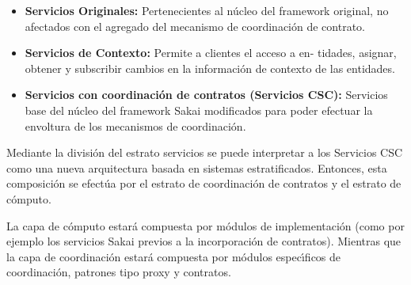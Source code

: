 \begin{itemize}

\item \textbf{Servicios Originales:} Pertenecientes al núcleo del framework original, no afectados con el agregado del mecanismo
de coordinación de contrato.

\item \textbf{Servicios de Contexto:} Permite a clientes el acceso a en-
tidades, asignar, obtener y subscribir cambios en la información de contexto de las entidades.

\item \textbf{Servicios con coordinación de contratos (Servicios CSC):}
Servicios base del núcleo del framework Sakai modificados para poder efectuar la envoltura de los mecanismos de coordinación.


\end{itemize}

Mediante la división del estrato servicios se puede interpretar a los Servicios CSC como una nueva arquitectura basada en sistemas estratificados. Entonces, esta composición se efectúa por el estrato de coordinación de contratos y el estrato de cómputo. 

La capa de cómputo estará compuesta por módulos de implementación (como por ejemplo los  servicios Sakai previos a la incorporación de contratos). Mientras que la capa de coordinación estará compuesta por módulos especı́ficos de coordinación, patrones tipo proxy y contratos.

